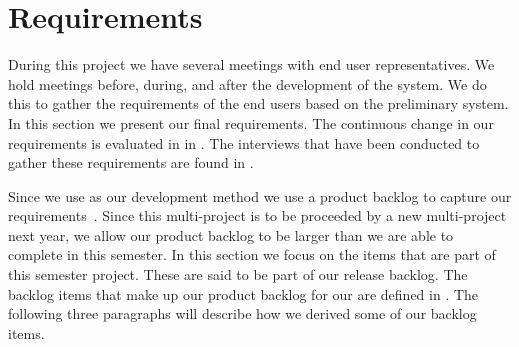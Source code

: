 \section{Requirements}
\label{sec:requirements}
During this project we have several meetings with end user representatives.
We hold meetings before, during, and after the development of the system. 
We do this to gather the requirements of the end users based on the preliminary system.
In this section we present our final requirements.
The continuous change in our requirements is evaluated in  in .
The interviews that have been conducted to gather these requirements are found in .

Since we use \scrum{} as our development method we use a product backlog to capture our requirements~\cite[p.~114]{Larman04}.
Since this multi-project is to be proceeded by a new multi-project next year, we allow our product backlog to be larger than we are able to complete in this semester.
In this section we focus on the items that are part of this semester project.
These are said to be part of our release backlog.
The backlog items that make up our product backlog for our \subsystem{} are defined in .
The following three paragraphs will describe how we derived some of our backlog items.

